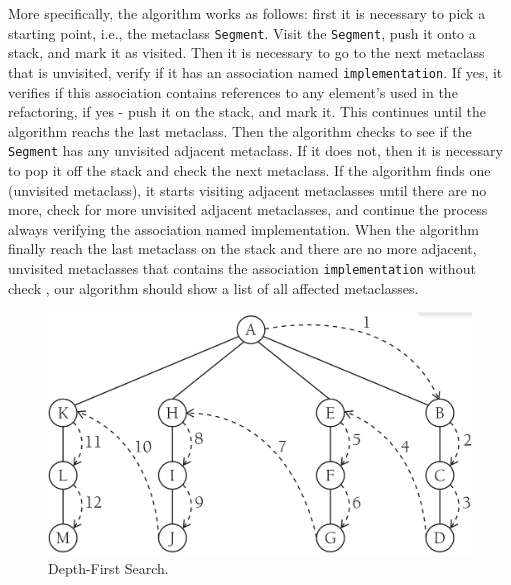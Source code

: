 More specifically, the algorithm works as follows: first it is necessary to pick a starting point, i.e., the metaclass \texttt{Segment}. Visit the \texttt{Segment}, push it onto a stack, and mark it as visited. Then it is necessary to go to the next metaclass that is unvisited, verify if it has an association named \texttt{implementation}. If yes, it verifies if this association contains references to any element's used in the refactoring, if yes - push it on the stack, and mark it. This continues until the algorithm reachs the last metaclass. Then the algorithm checks to see if the \texttt{Segment} has any unvisited adjacent metaclass. If it does not, then it is necessary to pop it off the stack and check the next metaclass. If the algorithm finds one (unvisited metaclass), it starts visiting adjacent metaclasses until there are no more, check for more unvisited adjacent metaclasses, and continue the process always verifying the association named implementation. When the algorithm finally reach the last metaclass on the stack and there are no more adjacent, unvisited metaclasses that contains the association \texttt{implementation} without check , our algorithm should show a list of all affected metaclasses. 
%
%
%
%
%
%
%
%
%

\begin{figure}
	\centering
	\includegraphics[scale=0.2]{figuras/algWorks2}
	\caption{Depth-First Search.}
	\label{fig:algWorks2}
\end{figure}











